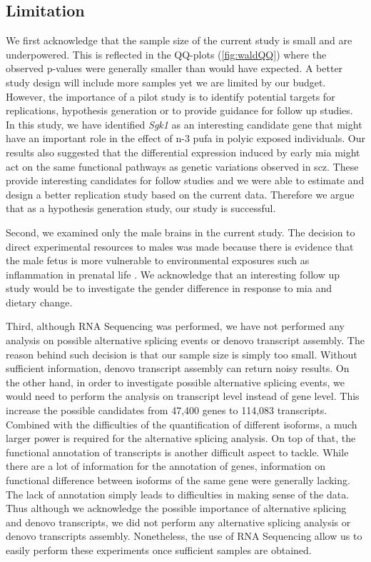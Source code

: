 \subsection{Limitation}
We first acknowledge that the sample size of the current study is small and are underpowered.
This is reflected in the QQ-plots (\cref{fig:waldQQ}) where the observed p-values were generally smaller than would have expected.
A better study design will include more samples yet we are limited by our budget.
However, the importance of a pilot study is to identify potential targets for replications, hypothesis generation or to provide guidance for follow up studies. 
In this study, we have identified \textit{Sgk1} as an interesting candidate gene that might have an important role in the effect of n-3 \gls{pufa} in \gls{polyic} exposed individuals.
Our results also suggested that the differential expression induced by early \gls{mia} might act on the same functional pathways as genetic variations observed in \gls{scz}.
These provide interesting candidates for follow studies and we were able to estimate and design a better replication study based on the current data. 
Therefore we argue that as a hypothesis generation study, our study is successful.

Second, we examined only the male brains in the current study. 
The decision to direct experimental resources to males was made because there is evidence that the male fetus is more vulnerable to environmental exposures such as inflammation in prenatal life \citep{Bergeron2013,Lein2007}. 
We acknowledge that an interesting follow up study would be to investigate the gender difference in response to \gls{mia} and dietary change.

Third, although RNA Sequencing was performed, we have not performed any analysis on possible alternative splicing events or denovo transcript assembly.
The reason behind such decision is that our sample size is simply too small.
Without sufficient information, denovo transcript assembly can return noisy results.
On the other hand, in order to investigate possible alternative splicing events, we would need to perform the analysis on transcript level instead of gene level. 
This increase the possible candidates from 47,400 genes to 114,083 transcripts.
Combined with the difficulties of the quantification of different isoforms, a much larger power is required for the alternative splicing analysis. 
On top of that, the functional annotation of transcripts is another difficult aspect to tackle.
While there are a lot of information for the annotation of genes, information on functional difference between isoforms of the same gene were generally lacking. 
The lack of annotation simply leads to difficulties in making sense of the data. 
Thus although we acknowledge the possible importance of alternative splicing and denovo transcripts, we did not perform any alternative splicing analysis or denovo transcripts assembly.
Nonetheless, the use of RNA Sequencing allow us to easily perform these experiments once sufficient samples are obtained.

